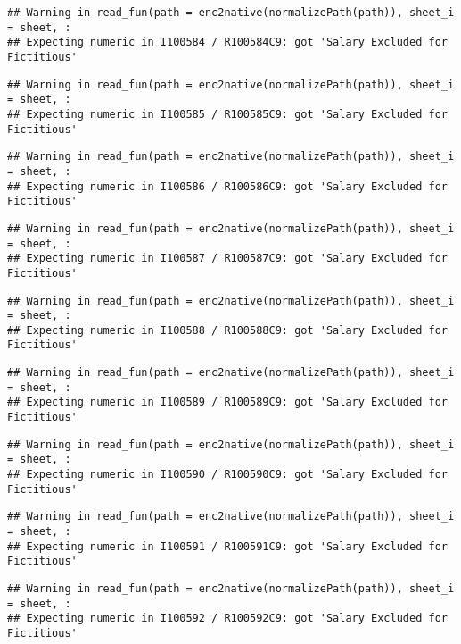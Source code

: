 \documentclass[
]{article}
\begin{document}
\begin{verbatim}
## Warning in read_fun(path = enc2native(normalizePath(path)), sheet_i = sheet, :
## Expecting numeric in I100584 / R100584C9: got 'Salary Excluded for Fictitious'
\end{verbatim}

\begin{verbatim}
## Warning in read_fun(path = enc2native(normalizePath(path)), sheet_i = sheet, :
## Expecting numeric in I100585 / R100585C9: got 'Salary Excluded for Fictitious'
\end{verbatim}

\begin{verbatim}
## Warning in read_fun(path = enc2native(normalizePath(path)), sheet_i = sheet, :
## Expecting numeric in I100586 / R100586C9: got 'Salary Excluded for Fictitious'
\end{verbatim}

\begin{verbatim}
## Warning in read_fun(path = enc2native(normalizePath(path)), sheet_i = sheet, :
## Expecting numeric in I100587 / R100587C9: got 'Salary Excluded for Fictitious'
\end{verbatim}

\begin{verbatim}
## Warning in read_fun(path = enc2native(normalizePath(path)), sheet_i = sheet, :
## Expecting numeric in I100588 / R100588C9: got 'Salary Excluded for Fictitious'
\end{verbatim}

\begin{verbatim}
## Warning in read_fun(path = enc2native(normalizePath(path)), sheet_i = sheet, :
## Expecting numeric in I100589 / R100589C9: got 'Salary Excluded for Fictitious'
\end{verbatim}

\begin{verbatim}
## Warning in read_fun(path = enc2native(normalizePath(path)), sheet_i = sheet, :
## Expecting numeric in I100590 / R100590C9: got 'Salary Excluded for Fictitious'
\end{verbatim}

\begin{verbatim}
## Warning in read_fun(path = enc2native(normalizePath(path)), sheet_i = sheet, :
## Expecting numeric in I100591 / R100591C9: got 'Salary Excluded for Fictitious'
\end{verbatim}

\begin{verbatim}
## Warning in read_fun(path = enc2native(normalizePath(path)), sheet_i = sheet, :
## Expecting numeric in I100592 / R100592C9: got 'Salary Excluded for Fictitious'
\end{verbatim}
\end{document}
